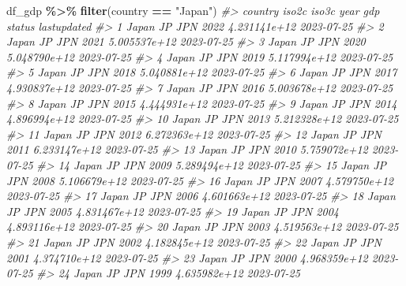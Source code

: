 \documentclass[
  xelatex, ja=standard]{bxjsbook}
\newenvironment{Shaded}{\begin{snugshade}}{\end{snugshade}}
\newcommand{\CommentTok}[1]{\textcolor[rgb]{0.56,0.35,0.01}{\textit{#1}}}
\newcommand{\FunctionTok}[1]{\textcolor[rgb]{0.13,0.29,0.53}{\textbf{#1}}}
\newcommand{\NormalTok}[1]{#1}
\newcommand{\SpecialCharTok}[1]{\textcolor[rgb]{0.81,0.36,0.00}{\textbf{#1}}}
\newcommand{\StringTok}[1]{\textcolor[rgb]{0.31,0.60,0.02}{#1}}
\theoremstyle{definition}
\theoremstyle{definition}
\theoremstyle{definition}
\theoremstyle{definition}
\theoremstyle{remark}
\begin{document}
\begin{Shaded}
\begin{Highlighting}[]
\NormalTok{df\_gdp }\SpecialCharTok{\%\textgreater{}\%} \FunctionTok{filter}\NormalTok{(country }\SpecialCharTok{==} \StringTok{"Japan"}\NormalTok{)}
\CommentTok{\#\textgreater{}    country iso2c iso3c year          gdp status lastupdated}
\CommentTok{\#\textgreater{} 1    Japan    JP   JPN 2022 4.231141e+12         2023{-}07{-}25}
\CommentTok{\#\textgreater{} 2    Japan    JP   JPN 2021 5.005537e+12         2023{-}07{-}25}
\CommentTok{\#\textgreater{} 3    Japan    JP   JPN 2020 5.048790e+12         2023{-}07{-}25}
\CommentTok{\#\textgreater{} 4    Japan    JP   JPN 2019 5.117994e+12         2023{-}07{-}25}
\CommentTok{\#\textgreater{} 5    Japan    JP   JPN 2018 5.040881e+12         2023{-}07{-}25}
\CommentTok{\#\textgreater{} 6    Japan    JP   JPN 2017 4.930837e+12         2023{-}07{-}25}
\CommentTok{\#\textgreater{} 7    Japan    JP   JPN 2016 5.003678e+12         2023{-}07{-}25}
\CommentTok{\#\textgreater{} 8    Japan    JP   JPN 2015 4.444931e+12         2023{-}07{-}25}
\CommentTok{\#\textgreater{} 9    Japan    JP   JPN 2014 4.896994e+12         2023{-}07{-}25}
\CommentTok{\#\textgreater{} 10   Japan    JP   JPN 2013 5.212328e+12         2023{-}07{-}25}
\CommentTok{\#\textgreater{} 11   Japan    JP   JPN 2012 6.272363e+12         2023{-}07{-}25}
\CommentTok{\#\textgreater{} 12   Japan    JP   JPN 2011 6.233147e+12         2023{-}07{-}25}
\CommentTok{\#\textgreater{} 13   Japan    JP   JPN 2010 5.759072e+12         2023{-}07{-}25}
\CommentTok{\#\textgreater{} 14   Japan    JP   JPN 2009 5.289494e+12         2023{-}07{-}25}
\CommentTok{\#\textgreater{} 15   Japan    JP   JPN 2008 5.106679e+12         2023{-}07{-}25}
\CommentTok{\#\textgreater{} 16   Japan    JP   JPN 2007 4.579750e+12         2023{-}07{-}25}
\CommentTok{\#\textgreater{} 17   Japan    JP   JPN 2006 4.601663e+12         2023{-}07{-}25}
\CommentTok{\#\textgreater{} 18   Japan    JP   JPN 2005 4.831467e+12         2023{-}07{-}25}
\CommentTok{\#\textgreater{} 19   Japan    JP   JPN 2004 4.893116e+12         2023{-}07{-}25}
\CommentTok{\#\textgreater{} 20   Japan    JP   JPN 2003 4.519563e+12         2023{-}07{-}25}
\CommentTok{\#\textgreater{} 21   Japan    JP   JPN 2002 4.182845e+12         2023{-}07{-}25}
\CommentTok{\#\textgreater{} 22   Japan    JP   JPN 2001 4.374710e+12         2023{-}07{-}25}
\CommentTok{\#\textgreater{} 23   Japan    JP   JPN 2000 4.968359e+12         2023{-}07{-}25}
\CommentTok{\#\textgreater{} 24   Japan    JP   JPN 1999 4.635982e+12         2023{-}07{-}25}

\end{Highlighting}
\end{Shaded}
\end{document}
